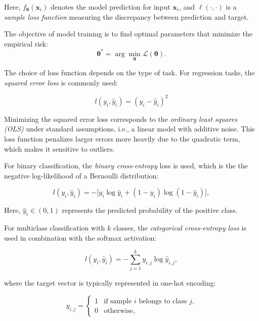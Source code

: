 Here, $f_{\boldsymbol{\theta}}(\mathbf{x}_i)$ denotes the model prediction for input $\mathbf{x}_i$, and $\ell(\cdot,\cdot)$ is a \emph{sample loss function} measuring the discrepancy between prediction and target.

The objective of model training is to find optimal parameters that minimize the empirical risk:
\begin{equation*}
\boldsymbol{\theta}^* = \arg\min_{\boldsymbol{\theta}} \mathcal{L}(\boldsymbol{\theta}).
\end{equation*}

The choice of loss function depends on the type of task. For regression tasks, the \textit{squared error loss} is commonly used:

\begin{equation*}
    l(y_i, \hat{y}_i) = {\left(y_i - \hat{y}_i\right)^2}
\end{equation*}

Minimizing the squared error loss corresponds to the \emph{ordinary least squares (OLS)} under standard assumptions, i.e., a linear model with additive noise. This loss function penalizes larger errors more heavily due to the quadratic term, which makes it sensitive to outliers.

For binary classification, the \textit{binary cross-entropy} loss is used, which is the the negative log-likelihood of a Bernoulli distribution:

\begin{equation*}
    l(y_i, \hat{y}_i) = - \Big[ y_i \log \hat{y}_i + (1 - y_i) \log (1 - \hat{y}_i) \Big],
\end{equation*}

Here, \(\hat{y}_i \in (0,1)\) represents the predicted probability of the positive class.

For multiclass classification with $k$ classes, the \textit{categorical cross-entropy loss} is used in combination with the softmax activation:

\begin{equation*}
    l(y_i, \hat{y}_i) = - \sum_{j=1}^{k} y_{i,j} \log \hat{y}_{i,j},
\end{equation*}

where the target vector is typically represented in one-hot encoding:

\begin{equation*}
    y_{i,j} = 
    \begin{cases} 
        1 & \text{if sample $i$ belongs to class $j$,} \\
        0 & \text{otherwise,} 
    \end{cases}
\end{equation*}

